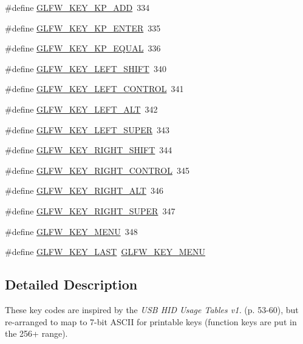 \begin{DoxyCompactItemize}
\item 
\#define \hyperlink{group__keys_gad09c7c98acc79e89aa6a0a91275becac}{G\-L\-F\-W\-\_\-\-K\-E\-Y\-\_\-\-K\-P\-\_\-\-A\-D\-D}~334
\item 
\#define \hyperlink{group__keys_ga4f728f8738f2986bd63eedd3d412e8cf}{G\-L\-F\-W\-\_\-\-K\-E\-Y\-\_\-\-K\-P\-\_\-\-E\-N\-T\-E\-R}~335
\item 
\#define \hyperlink{group__keys_gaebdc76d4a808191e6d21b7e4ad2acd97}{G\-L\-F\-W\-\_\-\-K\-E\-Y\-\_\-\-K\-P\-\_\-\-E\-Q\-U\-A\-L}~336
\item 
\#define \hyperlink{group__keys_ga8a530a28a65c44ab5d00b759b756d3f6}{G\-L\-F\-W\-\_\-\-K\-E\-Y\-\_\-\-L\-E\-F\-T\-\_\-\-S\-H\-I\-F\-T}~340
\item 
\#define \hyperlink{group__keys_ga9f97b743e81460ac4b2deddecd10a464}{G\-L\-F\-W\-\_\-\-K\-E\-Y\-\_\-\-L\-E\-F\-T\-\_\-\-C\-O\-N\-T\-R\-O\-L}~341
\item 
\#define \hyperlink{group__keys_ga7f27dabf63a7789daa31e1c96790219b}{G\-L\-F\-W\-\_\-\-K\-E\-Y\-\_\-\-L\-E\-F\-T\-\_\-\-A\-L\-T}~342
\item 
\#define \hyperlink{group__keys_gafb1207c91997fc295afd1835fbc5641a}{G\-L\-F\-W\-\_\-\-K\-E\-Y\-\_\-\-L\-E\-F\-T\-\_\-\-S\-U\-P\-E\-R}~343
\item 
\#define \hyperlink{group__keys_gaffca36b99c9dce1a19cb9befbadce691}{G\-L\-F\-W\-\_\-\-K\-E\-Y\-\_\-\-R\-I\-G\-H\-T\-\_\-\-S\-H\-I\-F\-T}~344
\item 
\#define \hyperlink{group__keys_gad1ca2094b2694e7251d0ab1fd34f8519}{G\-L\-F\-W\-\_\-\-K\-E\-Y\-\_\-\-R\-I\-G\-H\-T\-\_\-\-C\-O\-N\-T\-R\-O\-L}~345
\item 
\#define \hyperlink{group__keys_ga687b38009131cfdd07a8d05fff8fa446}{G\-L\-F\-W\-\_\-\-K\-E\-Y\-\_\-\-R\-I\-G\-H\-T\-\_\-\-A\-L\-T}~346
\item 
\#define \hyperlink{group__keys_gad4547a3e8e247594acb60423fe6502db}{G\-L\-F\-W\-\_\-\-K\-E\-Y\-\_\-\-R\-I\-G\-H\-T\-\_\-\-S\-U\-P\-E\-R}~347
\item 
\#define \hyperlink{group__keys_ga9845be48a745fc232045c9ec174d8820}{G\-L\-F\-W\-\_\-\-K\-E\-Y\-\_\-\-M\-E\-N\-U}~348
\item 
\#define \hyperlink{group__keys_ga442cbaef7bfb9a4ba13594dd7fbf2789}{G\-L\-F\-W\-\_\-\-K\-E\-Y\-\_\-\-L\-A\-S\-T}~\hyperlink{group__keys_ga9845be48a745fc232045c9ec174d8820}{G\-L\-F\-W\-\_\-\-K\-E\-Y\-\_\-\-M\-E\-N\-U}
\end{DoxyCompactItemize}


\subsection{Detailed Description}
These key codes are inspired by the {\itshape U\-S\-B H\-I\-D Usage Tables v1.} (p. 53-\/60), but re-\/arranged to map to 7-\/bit A\-S\-C\-I\-I for printable keys (function keys are put in the 256+ range).

